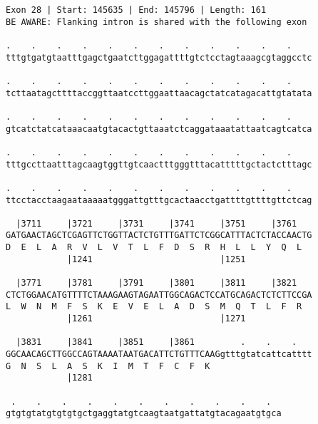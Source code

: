 \documentclass{article}
\begin{document}
\begin{Verbatim}
Exon 28 | Start: 145635 | End: 145796 | Length: 161
BE AWARE: Flanking intron is shared with the following exon
 
.    .    .    .    .    .    .    .    .    .    .    .    
tttgtgatgtaatttgagctgaatcttggagattttgtctcctagtaaagcgtaggcctc
  
.    .    .    .    .    .    .    .    .    .    .    .    
tcttaatagcttttaccggttaatccttggaattaacagctatcatagacattgtatata
  
.    .    .    .    .    .    .    .    .    .    .    .    
gtcatctatcataaacaatgtacactgttaaatctcaggataaatattaatcagtcatca
  
.    .    .    .    .    .    .    .    .    .    .    .    
tttgccttaatttagcaagtggttgtcaactttgggtttacatttttgctactctttagc
  
.    .    .    .    .    .    .    .    .    .    .    .    
ttcctacctaagaataaaaatgggattgtttgcactaacctgattttgttttgttctcag
  
  |3711     |3721     |3731     |3741     |3751     |3761   
GATGAACTAGCTCGAGTTCTGGTTACTCTGTTTGATTCTCGGCATTTACTCTACCAACTG
D  E  L  A  R  V  L  V  T  L  F  D  S  R  H  L  L  Y  Q  L  
            |1241                         |1251             
  
  |3771     |3781     |3791     |3801     |3811     |3821   
CTCTGGAACATGTTTTCTAAAGAAGTAGAATTGGCAGACTCCATGCAGACTCTCTTCCGA
L  W  N  M  F  S  K  E  V  E  L  A  D  S  M  Q  T  L  F  R  
            |1261                         |1271             
  
  |3831     |3841     |3851     |3861         .    .    .   
GGCAACAGCTTGGCCAGTAAAATAATGACATTCTGTTTCAAGgtttgtatcattcatttt
G  N  S  L  A  S  K  I  M  T  F  C  F  K                    
            |1281                                           
  
 .    .    .    .    .    .    .    .    .    .    .  
gtgtgtatgtgtgtgctgaggtatgtcaagtaatgattatgtacagaatgtgca
\end{Verbatim}
\newpage
\end{document}
